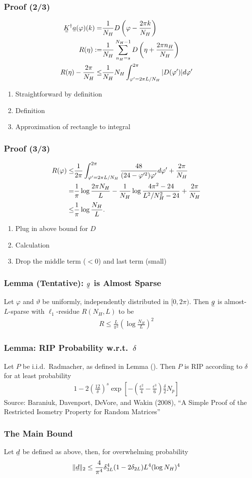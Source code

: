 \documentclass{beamer}
\newcommand{\Disp}[1]{\begin{align} #1 \end{align}}
\renewcommand{\H}{\dagger}
\newcommand{\NT}{\notag}
\renewcommand{\d}{\delta}
\newcommand{\f}{\varphi}
\renewcommand{\th}{\vartheta}
\newcommand{\I}{\item}
\newcommand{\F}[1]{\frac{#1}}
\newcommand{\V}[1]{\stackunder[1.2pt]{$#1$}{\rule{.9ex}{.075ex}}}
\newcommand{\M}[1]{\V{\V{#1}}}
\begin{document}
\begin{frame}
\frametitle{Proof (2/3)}
\Disp{
\M{K}^\H \V{a}(\f) (k)
=&\F{1}{N_H} D \left( \f -\F{2 \pi k} {N_H} \right) \\
R(\eta)
:=&\F{1}{N_H} \sum_{n_H =s}^{N_H -1} D \left( \eta +\F{2 \pi n_H} {N_H} \right) \\
R(\eta) -\F{2\pi} {N_H}
\leq &\F{1}{N_H} N_H \int_{\f'=2\pi L/N_H}^{2\pi} |D(\f')| d \f'
}
\begin{enumerate}
\I Straightforward by definition
\I Definition
\I Approximation of rectangle to integral
\end{enumerate}
\end{frame}

\begin{frame}
\frametitle{Proof (3/3)}
\Disp{
R(\f)
\leq &\F{1}{2\pi} \int_{\f'=2\pi L/N_H}^{2\pi} \F{48}{(24 -\f'^2) \f'} d \f'
+\F{2\pi} {N_H} \NT \\
=&\F{1}{\pi} \log \F{2\pi N_H}{L}
-\F{1}{N_H} \log \F{4\pi^2 -24} {L^2/N_H^2 -24}
+\F{2\pi} {N_H} \\
\leq &\F{1}{\pi} \log \F{N_H}{L}.
}
\begin{enumerate}
\I Plug in above bound for \(D\)
\I Calculation
\I Drop the middle term (\(<0\)) and last term (small)
\end{enumerate}
\end{frame}

\begin{frame}
\frametitle{Lemma (Tentative): \(\V{g}\) is Almost Sparse}
Let \(\f\) and \(\th\) be uniformly, independently distributed in \([0,2\pi)\).
Then \(\V{g}\) is almost-\(L\)-sparse with \(\ell_1\)-residue \(R(N_H, L)\) to be
\Disp{
R
\leq \F{L}{\pi^2} \left( \log \F{N_H}{L} \right)^2
}
\end{frame}



\begin{frame}
\frametitle{Lemma: RIP Probability w.r.t.\ \(\d\)}
Let \(P\) be i.i.d.\ Radmacher, as defined in Lemma ().
Then \(P\) is RIP according to \(\d\) for at least probability
\Disp{
1 -2 \left( \F{12}{\d} \right)^s \exp \left[ - \left( \F{\epsilon^2}{4} -\F{\epsilon^3}{6} \right) \F{\d}{2} N_p \right]
}
{\small Source: Baraniuk, Davenport, DeVore, and Wakin (2008), ``A Simple Proof of the Restricted Isometry Property for Random Matrices''}
\end{frame}

\begin{frame}
\frametitle{The Main Bound}
Let \(\V{d}\) be defined as above, then, for overwhelming probability
\Disp{
\|\V{d}\|_2
\leq \F{4}{\pi^4} \d_{3L}^4 (1-2\d_{2L}) L^4 ( \log N_H )^4
}
\end{frame}
\end{document}

